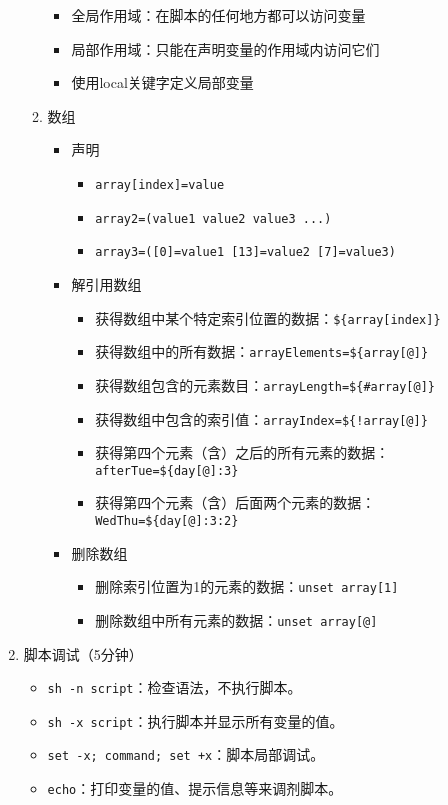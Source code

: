 \documentclass{TIJMUjiaoanLL}
\begin{document}
\begin{enumerate}
\begin{enumerate}
\begin{itemize}
	  \item 全局作用域：在脚本的任何地方都可以访问变量
	  \item 局部作用域：只能在声明变量的作用域内访问它们
	  \item 使用local关键字定义局部变量
	\end{itemize}
      \item 数组
	\begin{itemize}
	  \item 声明
	\vspace*{-5pt}
	    \begin{itemize}
	      \item \verb|array[index]=value|
	      \item \verb|array2=(value1 value2 value3 ...)|
	      \item \verb|array3=([0]=value1 [13]=value2 [7]=value3)|
	    \end{itemize}
	  \item 解引用数组
	    \begin{itemize}
	      \item 获得数组中某个特定索引位置的数据：\verb|${array[index]}|
	      \item 获得数组中的所有数据：\verb|arrayElements=${array[@]}|
	      \item 获得数组包含的元素数目：\verb|arrayLength=${#array[@]}|
	      \item 获得数组中包含的索引值：\verb|arrayIndex=${!array[@]}|
	      \item 获得第四个元素（含）之后的所有元素的数据：\verb|afterTue=${day[@]:3}|
	      \item 获得第四个元素（含）后面两个元素的数据：\verb|WedThu=${day[@]:3:2}|
	    \end{itemize}
	  \item 删除数组
	    \begin{itemize}
	      \item 删除索引位置为1的元素的数据：\verb|unset array[1]|
	      \item 删除数组中所有元素的数据：\verb|unset array[@]|
	    \end{itemize}
	\end{itemize}
    \end{enumerate}

  \item 脚本调试（5分钟）
    \begin{itemize}
      \item \verb|sh -n script|：检查语法，不执行脚本。
      \item \verb|sh -x script|：执行脚本并显示所有变量的值。
      \item \verb|set -x; command; set +x|：脚本局部调试。
      \item \verb|echo|：打印变量的值、提示信息等来调剂脚本。
    \end{itemize}



\end{enumerate}
\end{document}
